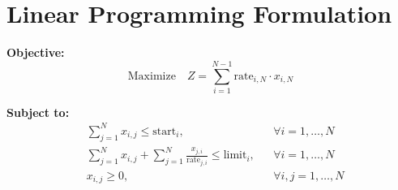 \documentclass{article}
\begin{document}
\section*{Linear Programming Formulation}

\textbf{Objective:}
\[
\text{Maximize} \quad Z = \sum_{i=1}^{N-1} \text{rate}_{i,N} \cdot x_{i,N}
\]

\textbf{Subject to:}
\begin{align*}
& \sum_{j=1}^{N} x_{i,j} \leq \text{start}_i, && \forall i = 1, \ldots, N \\
& \sum_{j=1}^{N} x_{i,j} + \sum_{j=1}^{N} \frac{x_{j,i}}{\text{rate}_{j,i}} \leq \text{limit}_i, && \forall i = 1, \ldots, N \\
& x_{i,j} \geq 0, && \forall i, j = 1, \ldots, N
\end{align*}
\end{document}
